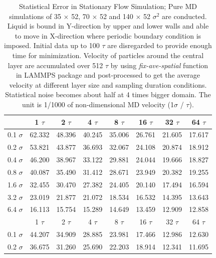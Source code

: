 \documentclass[preprint,12pt]{elsarticle}
\begin{document}
\begin{table}
  \caption{\small Statistical Error in Stationary Flow Simulation; Pure MD simulations of 35 $\times$ 52, 70 $\times$ 52 and 140 $\times$ 52 ${\sigma}^2$ are conducted. Liquid is bound in Y-direction by upper and lower walls and able to move in X-direction where periodic boundary condition is imposed. Initial data up to 100 $\tau$ are disregarded to provide enough time for minimization. Velocity of particles around the central layer are accumulated over 512 $\tau$ by using {\it{fix-ave-spatial}} function in LAMMPS package and post-processed to get the average velocity at different layer size and sampling duration conditions. Statistical noise becomes about half at 4 times bigger domain. The unit is 1/1000 of non-dimensional MD velocity (1$\sigma$ / $\tau$).}
  \label{table:MD_Vel0}
  \centering
\footnotesize
  \begin{tabular}{c || c c c c c c c}
\hline
	&	1 $\tau$	&	2 $\tau$	&	4 $\tau$	&	8 $\tau$	&	16 $\tau$	 &	32 $\tau$	&	64 $\tau$	\\
\hline
0.1 $\sigma$	&	62.332 	&	48.396 	&	40.245 	&	35.006 	&	26.761 	&	 21.605 	&	17.617 	\\
0.2 $\sigma$	&	53.821 	&	43.877 	&	36.693 	&	32.067 	&	24.108 	&	 20.874 	&	18.912 	\\
0.4 $\sigma$	&	46.200 	&	38.967 	&	33.122 	&	29.881 	&	24.044 	&	 19.666 	&	18.827 	\\
0.8 $\sigma$	&	40.087 	&	35.490 	&	31.412 	&	28.671 	&	23.949 	&	 20.382 	&	19.255 	\\
1.6 $\sigma$	&	32.455 	&	30.470 	&	27.382 	&	24.405 	&	20.140 	&	 17.494 	&	16.594 	\\
3.2 $\sigma$	&	23.019 	&	21.877 	&	21.072 	&	18.534 	&	16.532 	&	 14.395 	&	13.643 	\\
6.4 $\sigma$	&	16.113 	&	15.754 	&	15.289 	&	14.649 	&	13.459 	&	 12.909 	&	12.858 	\\
\hline
\hline
	&	1 $\tau$	&	2 $\tau$	&	4 $\tau$	&	8 $\tau$	&	16 $\tau$	 &	32 $\tau$	&	64 $\tau$	\\
\hline
0.1 $\sigma$	&	44.207 	&	34.909 	&	28.885 	&	23.981 	&	17.466 	&	 12.986 	&	12.630 	\\
0.2 $\sigma$	&	36.675 	&	31.260 	&	25.690 	&	22.203 	&	18.914 	&	 12.341 	&	11.695 	\\

\end{tabular}
\end{table}
\end{document}
